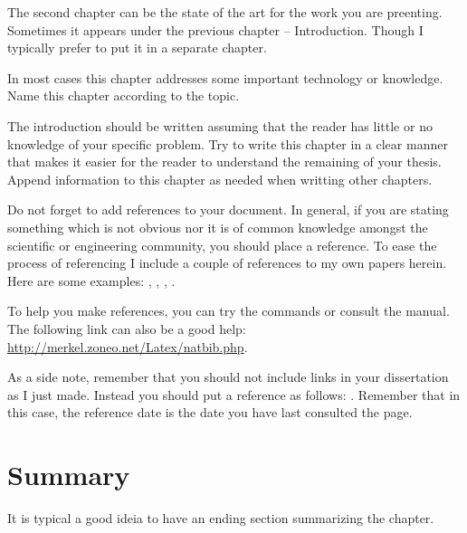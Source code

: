 The second chapter can be the state of the art for the work you are preenting. Sometimes it appears under the previous chapter -- Introduction. Though I typically prefer to put it in a separate chapter.

In most cases this chapter addresses some important technology or knowledge. Name this chapter according to the topic.

The introduction should be written assuming that the reader has little or no knowledge of your specific problem. Try to write this chapter in a clear manner that makes it easier for the reader to understand the remaining of your thesis. Append information to this chapter as needed when writting other chapters.

Do not forget to add references to your document. In general, if you are stating something which is not obvious nor it is of common knowledge amongst the scientific or engineering community, you should place a reference. To ease the process of referencing I include a couple of references to my own papers herein. Here are some examples: \cite{tomas2010bda}, \citep{tomas2010aqa}, \citet{ramalho2010eic}, \mbox{\cite[(2.2)]{tomas2009nct}}.

To help you make references, you can try the commands or consult the manual. The following link can also be a good help:
\mbox{\underline{http://merkel.zoneo.net/Latex/natbib.php}}.

As a side note, remember that you should not include links in your dissertation as I just made. Instead you should put a reference as follows: \cite{mylink}. Remember that in this case, the reference date is the date you have last consulted the page.

\section{Summary}

It is typical a good ideia to have an ending section summarizing the chapter.

\cleardoublepage 
